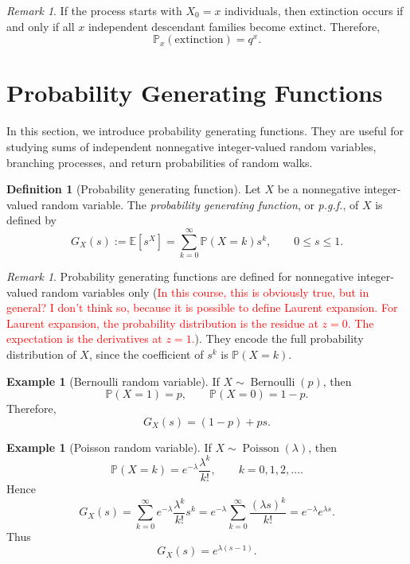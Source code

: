 \documentclass[11pt]{article}
\theoremstyle{plain}
\theoremstyle{definition}
\newtheorem{definition}[theorem]{Definition}
\newtheorem{example}[theorem]{Example}
\theoremstyle{remark}
\newtheorem{remark}[theorem]{Remark}
\begin{document}
	\begin{remark}
		If the process starts with \(X_0=x\) individuals, then extinction occurs if and only if all \(x\) independent descendant families become extinct. Therefore,
		\[
		\mathbb{P}_x(\text{extinction})
		=
		q^x.
		\]
	\end{remark}
	
	
	\section{Probability Generating Functions}
	
	In this section, we introduce probability generating functions. They are useful for studying sums of independent nonnegative integer-valued random variables, branching processes, and return probabilities of random walks.
	\begin{definition}[Probability generating function]
		Let \(X\) be a nonnegative integer-valued random variable. The \emph{probability generating function}, or \emph{p.g.f.}, of \(X\) is defined by
		\[
		G_X(s)
		:=
		\mathbb{E}[s^X]
		=
		\sum_{k=0}^{\infty}\mathbb{P}(X=k)s^k,
		\qquad 0\le s\le 1.
		\]
	\end{definition}
	
	\begin{remark}
		Probability generating functions are defined for nonnegative integer-valued random variables only (\textcolor{red}{In this course, this is obviously true, but in general? I don't think so, because it is possible to define Laurent expansion. For Laurent expansion, the probability distribution is the residue at $z=0$. The expectation is the derivatives at $z=1$.}). They encode the full probability distribution of \(X\), since the coefficient of \(s^k\) is \(\mathbb{P}(X=k)\).
	\end{remark}
	
	\begin{example}[Bernoulli random variable]
		If \(X\sim\operatorname{Bernoulli}(p)\), then
		\[
		\mathbb{P}(X=1)=p,
		\qquad
		\mathbb{P}(X=0)=1-p.
		\]
		Therefore,
		\[
		G_X(s)
		=
		(1-p)+ps.
		\]
	\end{example}
	
	\begin{example}[Poisson random variable]
		If \(X\sim\operatorname{Poisson}(\lambda)\), then
		\[
		\mathbb{P}(X=k)=e^{-\lambda}\frac{\lambda^k}{k!},
		\qquad k=0,1,2,\dots.
		\]
		Hence
		\[
		G_X(s)
		=
		\sum_{k=0}^{\infty}e^{-\lambda}\frac{\lambda^k}{k!}s^k
		=
		e^{-\lambda}\sum_{k=0}^{\infty}\frac{(\lambda s)^k}{k!}
		=
		e^{-\lambda}e^{\lambda s}.
		\]
		Thus
		\[
		G_X(s)=e^{\lambda(s-1)}.
		\]
	\end{example}
	
\end{document}
